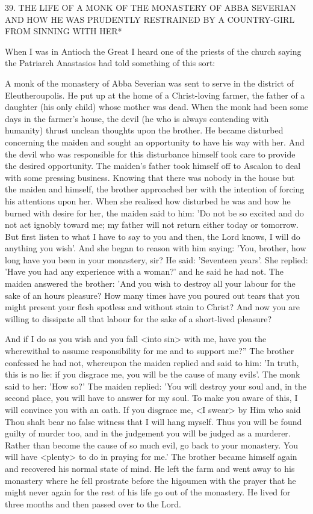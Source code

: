 39. THE LIFE OF A MONK OF THE MONASTERY OF
ABBA SEVERIAN AND HOW HE WAS PRUDENTLY
RESTRAINED BY A COUNTRY-GIRL
FROM SINNING WITH HER*

When I was in Antioch the Great I heard one of the priests of the
church saying the Patriarch Anastasios had told something of this
sort:

A monk of the monastery of Abba Severian was sent to serve in the
district of Eleutheroupolis. He put up at the home of a Christ-loving
farmer, the father of a daughter (his only child) whose mother was
dead. When the monk had been some days in the farmer's house,
the devil (he who is always contending with humanity) thrust
unclean thoughts upon the brother. He became disturbed concerning
the maiden and sought an opportunity to have his way with her.
And the devil who was responsible for this disturbance himself took
care to provide the desired opportunity. The maiden's father took
himself off to Ascalon to deal with some pressing business. Knowing
that there was nobody in the house but the maiden and himself, the
brother approached her with the intention of forcing his attentions
upon her. When she realised how disturbed he was and how he
burned with desire for her, the maiden said to him: 'Do not be so
excited and do not act ignobly toward me; my father will not return
either today or tomorrow. But first listen to what I have to say to
you and then, the Lord knows, I will do anything you wish'. And
she began to reason with him saying: 'You, brother, how long have
you been in your monastery, sir? He said: 'Seventeen years'. She
replied: 'Have you had any experience with a woman?' and he said
he had not. The maiden answered the brother: 'And you wish to
destroy all your labour for the sake of an hour\textquotesingle s pleasure? How
many times have you poured out tears that you might present your
flesh spotless and without stain to Christ? And now you are willing
to dissipate all that labour for the sake of a short-lived pleasure?

And if I do as you wish and you fall <into sin> with me, have you
the wherewithal to assume responsibility for me and to support me?”
The brother confessed he had not, whereupon the maiden replied
and said to him: 'In truth, this is no lie: if you disgrace me, you will
be the cause of many evils'. The monk said to her: 'How so?' The
maiden replied: 'You will destroy your soul and, in the second
place, you will have to answer for my soul. To make you aware of
this, I will convince you with an oath. If you disgrace me, <I
swear> by Him who said Thou shalt bear no false witness that I will
hang myself. Thus you will be found guilty of murder too, and in
the judgement you will be judged as a murderer. Rather than
become the cause of so much evil, go back to your monastery. You
will have <plenty> to do in praying for me.' The brother became
himself again and recovered his normal state of mind. He left the
farm and went away to his monastery where he fell prostrate before
the higoumen with the prayer that he might never again for the rest
of his life go out of the monastery. He lived for three months and
then passed over to the Lord.

